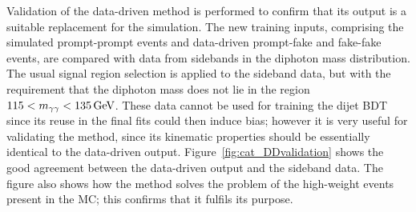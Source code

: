 Validation of the data-driven method is performed to confirm that its output is 
a suitable replacement for the simulation.
The new training inputs, 
comprising the simulated prompt-prompt events and data-driven prompt-fake and fake-fake events, 
are compared with data from sidebands in the diphoton mass distribution.
The usual signal region selection is applied to the sideband data, 
but with the requirement that the diphoton mass does not lie in the region $115 < m_{\gamma\gamma} < \SI{135}{GeV}$.
These data cannot be used for training the dijet BDT since its reuse in the final fits 
could then induce bias; 
however it is very useful for validating the method, 
since its kinematic properties should be essentially identical to the data-driven output.
Figure~\ref{fig:cat_DDvalidation} shows the good agreement between the data-driven output
and the sideband data. 
The figure also shows how the method solves the problem of the high-weight events present in the MC; 
this confirms that it fulfils its purpose.

